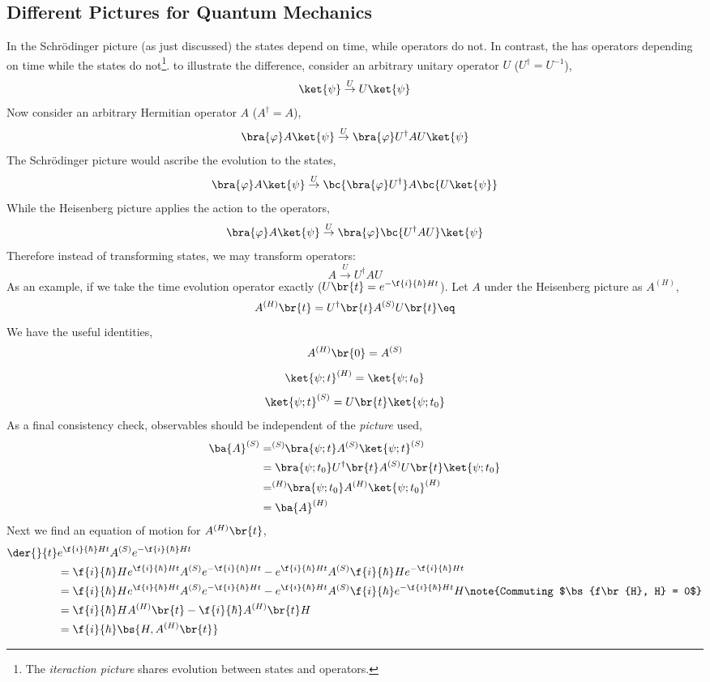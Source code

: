 \documentclass{article}
\begin{document}
\subsection{Different Pictures for Quantum Mechanics}
In the Schrödinger picture (as just discussed) the states depend on time, while operators do not. In contrast, the  has operators depending on time while the states do not\footnote{The \textit{iteraction picture} shares evolution between states and operators.}. to illustrate the difference, consider an arbitrary unitary operator $U$ ($U^{\dagger} = U^{-1}$),
\[ \ket{\psi} \stackrel{U}{\to} U\ket{\psi} \]
Now consider an arbitrary Hermitian operator $A$ ($A^{\dagger} = A$),
\[ \bra{\varphi} A \ket{\psi} \stackrel{U}{\to} \bra{\varphi} U^{\dagger}A U\ket{\psi} \]
The Schrödinger picture would ascribe the evolution to the states,
\[ \bra{\varphi} A \ket{\psi} \stackrel{U}{\to} \bc{\bra{\varphi} U^{\dagger}}A \bc{U\ket{\psi}} \]
While the Heisenberg picture applies the action to the operators,
\[ \bra{\varphi} A \ket{\psi} \stackrel{U}{\to} \bra{\varphi} \bc{U^{\dagger}A U}\ket{\psi} \]
Therefore instead of transforming states, we may transform operators:
\[ A \stackrel{U}{\to} U^{\dagger} A U \]
As an example, if we take the time evolution operator exactly ($U\br{t} = e^{-\f{i}{\hbar} H t}$). Let $A$ under the Heisenberg picture as $A^{(H)}$,
\[ A^{(H)}\br{t} = U^{\dagger}\br{t} A^{(S)} U\br{t} \eq \label{eq:HS}\]
We have the useful identities,
\[ A^{(H)}\br{0} = A^{(S)} \]
\[ \ket{\psi; t}^{(H)} = \ket{\psi; t_0} \]
\[ \ket{\psi; t}^{(S)} = U\br{t}\ket{\psi; t_0} \]
As a final consistency check, observables should be independent of the \textit{picture} used,
\begin{align*}
    \ba{A}^{(S)} &= ^{(S)}\!\!\bra{\psi;t} A^{(S)} \ket{\psi;t}^{(S)} \\
     &= \bra{\psi;t_0} U^{\dagger}\br{t}A^{(S)}U\br{t} \ket{\psi;t_0} \\
    &= ^{(H)}\!\!\bra{\psi;t_0} A^{(H)} \ket{\psi;t_0}^{(H)} \\
    &= \ba{A}^{(H)}
\end{align*}
Next we find an equation of motion for $A^{(H)}\br{t}$,
\begin{align*}
    \der{}{t} &e^{\f{i}{\hbar} H t}A^{(S)}e^{-\f{i}{\hbar} H t} \\
    &= \f{i}{\hbar} H e^{\f{i}{\hbar} H t}A^{(S)}e^{-\f{i}{\hbar} H t} - e^{\f{i}{\hbar} H t}A^{(S)} \f{i}{\hbar}He^{-\f{i}{\hbar} H t} \\
    &= \f{i}{\hbar} H e^{\f{i}{\hbar} H t}A^{(S)}e^{-\f{i}{\hbar} H t} - e^{\f{i}{\hbar} H t}A^{(S)} \f{i}{\hbar}e^{-\f{i}{\hbar} H t} H \note{Commuting $\bs{f\br{H}, H} = 0$} \\
    &= \f{i}{\hbar} H A^{(H)}\br{t} - \f{i}{\hbar} A^{(H)}\br{t} H  \\
    &= \f{i}{\hbar} \bs{H, A^{(H)}\br{t}}
\end{align*}
\end{document}
